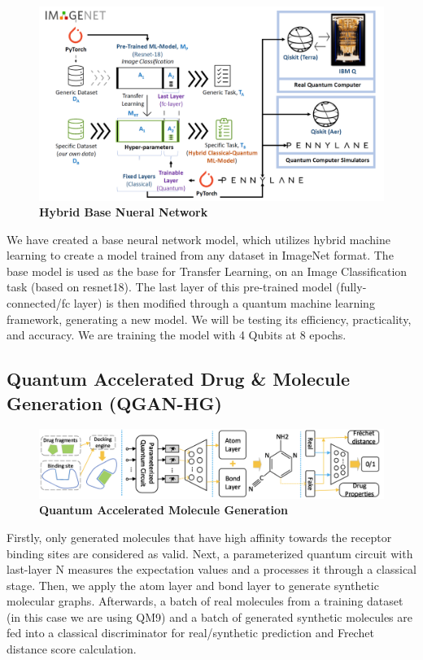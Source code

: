 \documentclass{scrartcl}
\begin{document}
\begin{figure}[htbp]
\centering
\includegraphics[width=.9\linewidth]{./assets/imagenet.png}
\caption{\textbf{Hybrid Base Nueral Network}}
\end{figure}

We have created a base neural network model, which utilizes hybrid machine learning to create a model trained from any dataset in ImageNet format. The base model is used as the base for Transfer Learning, on an Image Classification task (based on resnet18). The last layer of this pre-trained model (fully-connected/fc layer) is then modified through a quantum machine learning framework, generating a new model. We will be testing its efficiency, practicality, and accuracy. We are training the model with 4 Qubits at 8 epochs.

\subsection{Quantum Accelerated Drug \& Molecule Generation (QGAN-HG)}
\label{sec:org978dc50}

\begin{figure}[htbp]
\centering
\includegraphics[width=.9\linewidth]{./assets/quganflow.png}
\caption{\textbf{Quantum Accelerated Molecule Generation}}
\end{figure}

Firstly, only generated molecules that have high affinity towards the receptor binding sites are considered as valid. Next, a parameterized quantum circuit with last-layer N measures the expectation values and a processes it through a classical stage. Then, we apply the atom layer and bond layer to generate synthetic molecular graphs. Afterwards, a batch of real molecules from a training dataset (in this case we are using QM9) and a batch of generated synthetic molecules are fed into a classical discriminator for real/synthetic prediction and Frechet distance score calculation.
\end{document}
